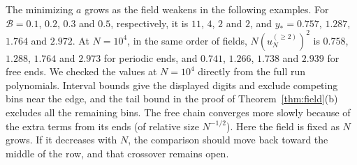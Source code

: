 The minimizing $a$ grows as the field weakens in the following examples.
For $\mathcal B=0.1$, $0.2$, $0.3$ and $0.5$, respectively, it is
$11$, $4$, $2$ and $2$, and $y_*=0.757$, $1.287$, $1.764$ and $2.972$.
At $N=10^4$, in the same order of fields,
$N(u_N^{(\ge2)})^2$ is $0.758$, $1.288$, $1.764$ and $2.973$ for periodic
ends, and $0.741$, $1.266$, $1.738$ and $2.939$ for free ends. We checked
the values at $N=10^4$ directly from the full run polynomials. Interval bounds
give the displayed digits and exclude competing bins near the edge,
and the tail bound in the proof of Theorem~\ref{thm:field}(b) excludes all the
remaining bins. The free
chain converges more slowly because of the extra terms from its ends
(of relative size $N^{-1/2}$). Here the field is fixed as $N$ grows.
If it decreases with $N$, the comparison should move back toward the middle
of the row, and that crossover remains open.
